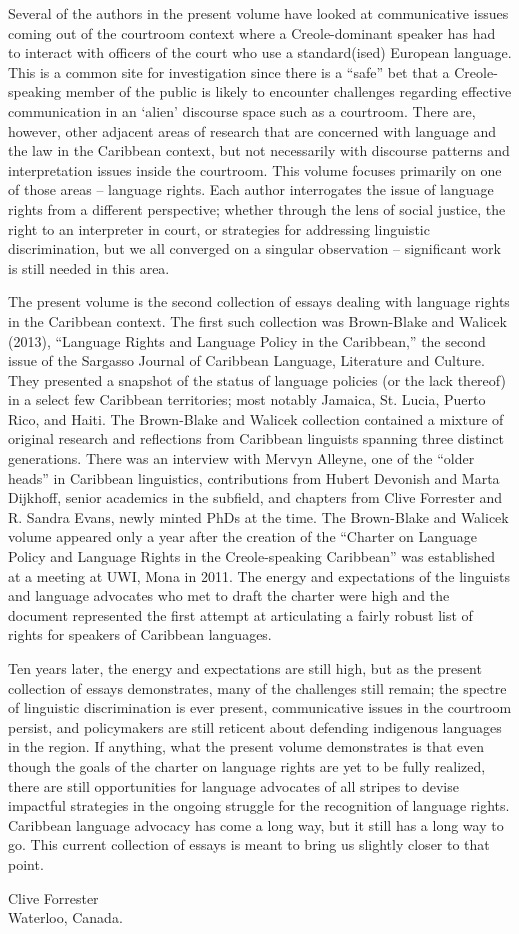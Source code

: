 Several of the authors in the present volume have looked at communicative issues coming out of the courtroom context where a Creole-dominant speaker has had to interact with officers of the court who use a standard(ised) European language. This is a common site for investigation since there is a “safe” bet that a Creole-speaking member of the public is likely to encounter challenges regarding effective communication in an ‘alien’ discourse space such as a courtroom. There are, however, other adjacent areas of research that are concerned with language and the law in the Caribbean context, but not necessarily with discourse patterns and interpretation issues inside the courtroom. This volume focuses primarily on one of those areas -- language rights. Each author interrogates the issue of language rights from a different perspective; whether through the lens of social justice, the right to an interpreter in court, or strategies for addressing linguistic discrimination, but we all converged on a singular observation -- significant work is still needed in this area.

The present volume is the second collection of essays dealing with language rights in the Caribbean context. The first such collection was Brown-Blake and Walicek (2013), “Language Rights and Language Policy in the Caribbean,” the second issue of the Sargasso Journal of Caribbean Language, Literature and Culture. They presented a snapshot of the status of language policies (or the lack thereof) in a select few Caribbean territories; most notably Jamaica, St. Lucia, Puerto Rico, and Haiti. The Brown-Blake and Walicek collection contained a mixture of original research and reflections from Caribbean linguists spanning three distinct generations. There was an interview with Mervyn Alleyne, one of the “older heads” in Caribbean linguistics, contributions from Hubert Devonish and Marta Dijkhoff, senior academics in the subfield, and chapters from Clive Forrester and R. Sandra Evans, newly minted PhDs at the time. The Brown-Blake and Walicek volume appeared only a year after the creation of the “Charter on Language Policy and Language Rights in the Creole-speaking Caribbean” was established at a meeting at UWI, Mona in 2011. The energy and expectations of the linguists and language advocates who met to draft the charter were high and the document represented the first attempt at articulating a fairly robust list of rights for speakers of Caribbean languages. 

Ten years later, the energy and expectations are still high, but as the present collection of essays demonstrates, many of the challenges still remain; the spectre of linguistic discrimination is ever present, communicative issues in the courtroom persist, and policymakers are still reticent about defending indigenous languages in the region. If anything, what the present volume demonstrates is that even though the goals of the charter on language rights are yet to be fully realized, there are still opportunities for language advocates of all stripes to devise impactful strategies in the ongoing struggle for the recognition of language rights. Caribbean language advocacy has come a long way, but it still has a long way to go. This current collection of essays is meant to bring us slightly closer to that point. 

\bigskip

{\large \noindent 
  Clive Forrester \\
  Waterloo, Canada. 
}


